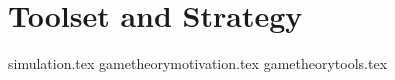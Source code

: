 \section{Toolset and Strategy}
  {simulation.tex}
  {gametheorymotivation.tex}
  {gametheorytools.tex}
